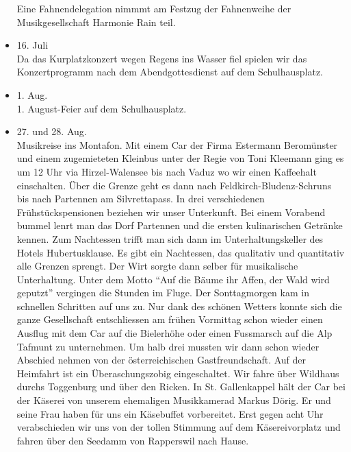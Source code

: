 \begin{history}
\begin{itemize}
        Eine Fahnendelegation nimmmt am Festzug der Fahnenweihe der
        Musikgesellschaft Harmonie Rain teil.

        \item[]16. Juli\\
        Da das Kurplatzkonzert wegen Regens ins Wasser fiel spielen wir das
        Konzertprogramm nach dem Abendgottesdienst auf dem Schulhausplatz.

        \item[]1. Aug.\\
        1. August-Feier auf dem Schulhausplatz.

        \item[]27. und 28. Aug.\\
        Musikreise ins Montafon. Mit einem Car der Firma Estermann Beromünster
        und einem zugemieteten Kleinbus unter der Regie von Toni Kleemann ging
        es um 12 Uhr via Hirzel-Walensee bis nach Vaduz wo wir einen Kaffeehalt
        einschalten. Über die Grenze geht es dann nach Feldkirch-Bludenz-Schruns
        bis nach Partennen am Silvrettapass. In drei verschiedenen
        Frühstückspensionen beziehen wir unser Unterkunft. Bei einem Vorabend
        bummel lenrt man das Dorf Partennen und die ersten kulinarischen
        Getränke kennen. Zum Nachtessen trifft man sich dann im
        Unterhaltungskeller des Hotels Hubertusklause. Es gibt ein Nachtessen,
        das qualitativ und quantitativ alle Grenzen sprengt. Der Wirt sorgte
        dann selber für musikalische Unterhaltung. Unter dem Motto \enquote{Auf
            die Bäume ihr Affen, der Wald wird geputzt} vergingen die Stunden im
        Fluge. Der Sonttagmorgen kam in schnellen Schritten auf uns zu. Nur dank
        des schönen Wetters konnte sich die ganze Gesellschaft entschliessen am
        frühen Vormittag schon wieder einen Ausflug mit dem Car auf die
        Bielerhöhe oder einen Fussmarsch auf die Alp Tafmunt zu unternehmen. Um
        halb drei mussten wir dann schon wieder Abschied nehmen von der
        österreichischen Gastfreundschaft. Auf der Heimfahrt ist ein
        Überaschungszobig eingeschaltet. Wir fahre über Wildhaus durchs
        Toggenburg und über den Ricken. In St. Gallenkappel hält der Car bei der
        Käserei von unserem ehemaligen Musikkamerad Markus Dörig. Er und seine
        Frau haben für uns ein Käsebuffet vorbereitet. Erst gegen acht Uhr
        verabschieden wir uns von der tollen Stimmung auf dem Käsereivorplatz
        und fahren über den Seedamm von Rapperswil nach Hause.


\end{itemize}
\end{history}
